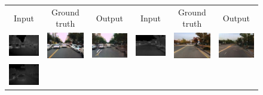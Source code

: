 \begin{figure}
\begin{center}
\bgroup 
 \def\arraystretch{0.2} 
 \setlength\tabcolsep{0.2pt}
\begin{tabular}{cccccc}
Input & Ground truth & Output & Input & Ground truth & Output \\ 
\includegraphics[width=0.16666666666667\linewidth]{figs/thermal2rgb_results/thermal1-1.jpg} &
\includegraphics[width=0.16666666666667\linewidth]{figs/thermal2rgb_results/thermal1-2.jpg} &
\includegraphics[width=0.16666666666667\linewidth]{figs/thermal2rgb_results/thermal1-3.jpg} \hspace{0.01in} &
\includegraphics[width=0.16666666666667\linewidth]{figs/thermal2rgb_results/thermal1-4.jpg} &
\includegraphics[width=0.16666666666667\linewidth]{figs/thermal2rgb_results/thermal1-5.jpg} &
\includegraphics[width=0.16666666666667\linewidth]{figs/thermal2rgb_results/thermal1-6.jpg} \\ 
\includegraphics[width=0.16666666666667\linewidth]{figs/thermal2rgb_results/thermal2-1.jpg} &

\end{tabular}
\end{center}
\end{figure}
